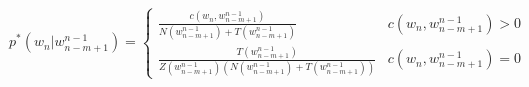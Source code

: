\begin{equation}
\label{equationo:witten_bell_04}
p^{*}(w_{n}|w_{n-m+1}^{n-1})=\begin{cases}
\frac{c(w_{n},w_{n-m+1}^{n-1})}{N(w_{n-m+1}^{n-1})+T(w_{n-m+1}^{n-1})} & c(w_{n},w_{n-m+1}^{n-1})>0 \\
\frac{T(w_{n-m+1}^{n-1})}{Z(w_{n-m+1}^{n-1})(N(w_{n-m+1}^{n-1})+T(w_{n-m+1}^{n-1}))} & c(w_{n},w_{n-m+1}^{n-1})=0 
\end{cases}
\end{equation}
